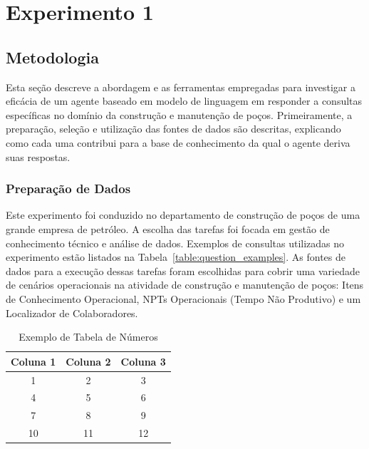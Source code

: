 

\chapter{Experimento 1}
    

    \section{Metodologia}
        
        Esta seção descreve a abordagem e as ferramentas empregadas para investigar a eficácia de um agente baseado em modelo de linguagem em responder a consultas específicas no domínio da construção e manutenção de poços. Primeiramente, a preparação, seleção e utilização das fontes de dados são descritas, explicando como cada uma contribui para a base de conhecimento da qual o agente deriva suas respostas.
            
        \subsection{Preparação de Dados}
            
            Este experimento foi conduzido no departamento de construção de poços de uma grande empresa de petróleo. A escolha das tarefas foi focada em gestão de conhecimento técnico e análise de dados. Exemplos de consultas utilizadas no experimento estão listados na Tabela~\ref{table:question_examples}. As fontes de dados para a execução dessas tarefas foram escolhidas para cobrir uma variedade de cenários operacionais na atividade de construção e manutenção de poços: Itens de Conhecimento Operacional, NPTs Operacionais (Tempo Não Produtivo) e um Localizador de Colaboradores.
    
    
            \begin{table}[ht]
                \centering %
                \caption{Exemplo de Tabela de Números}
                \label{tab:exemplo_numeros}
                \begin{tabular}{ccc} %
                    \toprule %
                    \textbf{Coluna 1} & \textbf{Coluna 2} & \textbf{Coluna 3} \\ %
                    \midrule %
                    1 & 2 & 3 \\ %
                    4 & 5 & 6 \\ %
                    7 & 8 & 9 \\ %
                    10 & 11 & 12 \\ %
                    \bottomrule %
                \end{tabular}
            \end{table}
    
